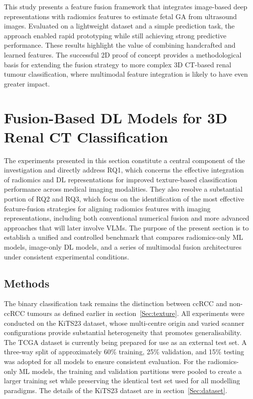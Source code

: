 This study presents a feature fusion framework that integrates image-based deep representations with radiomics features to estimate fetal GA from ultrasound images. Evaluated on a lightweight dataset and a simple prediction task, the approach enabled rapid prototyping while still achieving strong predictive performance. These results highlight the value of combining handcrafted and learned features. The successful 2D proof of concept provides a methodological basis for extending the fusion strategy to more complex 3D CT-based renal tumour classification, where multimodal feature integration is likely to have even greater impact.




\section{Fusion-Based DL Models for 3D Renal CT Classification}
\label{sec:fusion_models}

The experiments presented in this section constitute a central component of the investigation and directly address RQ1, which concerns the effective integration of radiomics and DL representations for improved texture-based classification performance across medical imaging modalities. They also resolve a substantial portion of RQ2 and RQ3, which focus on the identification of the most effective feature-fusion strategies for aligning radiomics features with imaging representations, including both conventional numerical fusion and more advanced approaches that will later involve VLMs. The purpose of the present section is to establish a unified and controlled benchmark that compares radiomics-only ML models, image-only DL models, and a series of multimodal fusion architectures under consistent experimental conditions.


\subsection{Methods}

The binary classification task remains the distinction between ccRCC and non-ccRCC tumours as defined earlier in section~\ref{Sec:texture}. All experiments were conducted on the KiTS23 dataset, whose multi-centre origin and varied scanner configurations provide substantial heterogeneity that promotes generalisability. The TCGA dataset is currently being prepared for use as an external test set. A three-way split of approximately 60\% training, 25\% validation, and 15\% testing was adopted for all models to ensure consistent evaluation. For the radiomics-only ML models, the training and validation partitions were pooled to create a larger training set while preserving the identical test set used for all modelling paradigms. The details of the KiTS23 dataset are in section~\ref{Sec:dataset}.

